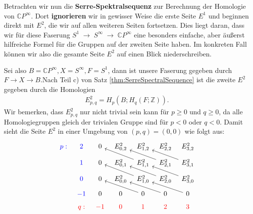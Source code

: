 \documentclass[12pt]{article}
\numberwithin{conj}{section}
\begin{document}
                    \smallskip
                    
                    Betrachten wir nun die \textbf{Serre-Spektralsequenz} zur Berechnung der Homologie von \(\mathbb{C}P^\infty\). Dort \textbf{ignorieren} wir in gewisser Weise die erste Seite \(E^1\) und beginnen direkt mit \(E^2\), die wir auf allen weiteren Seiten fortsetzen. Dies liegt daran, dass wir für diese Faserung \(
                    S^1 \;\longrightarrow\; S^\infty \;\longrightarrow\; \mathbb{C}P^\infty
                    \)
                    eine besonders einfache, aber äußerst hilfreiche Formel für die Gruppen auf der zweiten Seite haben. Im konkreten Fall können wir also die gesamte Seite \(E^2\) auf einen Blick niederschreiben.
                    
                    
                    Sei also $B = \mathbb{C}P^\infty, X = S^\infty, F = S^1$, dann ist unsere Faserung gegeben durch $F \to X \to B. $Nach Teil c) von Satz \ref{thm:SerreSpectralSequence} ist die zweite $E^2$ gegeben durch die Homologien
                    \begin{align}
                    E^2_{p,q} = H_p(B;H_q(F;\mathbb{Z})).
                    \end{align}
                    Wir bemerken, dass $E^2_{p,q}$ nur nicht trivial sein kann für $p \geq 0$ und $q \geq 0$, da alle Homologiegruppen gleich der trivialen Gruppe sind für $p<0$ oder $q<0$. Damit sieht die Seite $E^2$ in einer Umgebung von $(p,q) = (0,0)$ wie folgt aus:
                    \[\begin{tikzcd}[sep=tiny]
                        {\color{blue}p:} & {\color{blue}2} & 0 & {E^2_{0,2}} & {E^2_{1,2}} & {E^2_{2,2}} & {E^2_{3,2}} \\
                        & {\color{blue}1} & 0 & {E^2_{0,1}} & {E^2_{1,1}} & {E^2_{2,1}} & {E^2_{3,1}} \\
                        & {\color{blue}0} & 0 & {E^2_{0,0}} & {E^2_{1,0}} & {E^2_{2,0}} & {E^2_{3,0}} \\
                        & {\color{blue}-1} & 0 & 0 & 0 & 0 & 0 \\
                        & {\color{red}q:} & {\color{red}-1} & {\color{red}0} & {\color{red}1} & {\color{red}2} & {\color{red}3}
                        \arrow[from=2-5, to=1-3]
                        \arrow[from=2-6, to=1-4]
                        \arrow[from=2-7, to=1-5]
                        \arrow[from=3-5, to=2-3]
                        \arrow[from=3-6, to=2-4]
                        \arrow[from=3-7, to=2-5]
                        \arrow[from=4-5, to=3-3]
                        \arrow[from=4-6, to=3-4]
                        \arrow[from=4-7, to=3-5]
                    \end{tikzcd}\]
\end{document}

